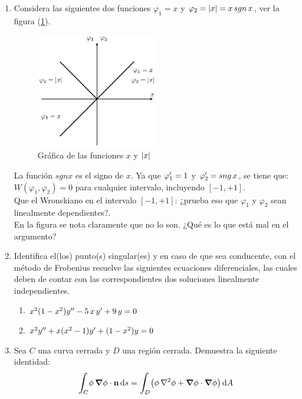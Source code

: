 \begin{enumerate}[resume]
\rule{14.6cm}{0.4pt}
\item Considera las siguientes dos funciones $\varphi_{1} = x$ y $\varphi_{2} = \abs{x} = x \, sgn \, x$, ver la figura (\ref{fig:figura_09_03}).
\\[0.5em]
\begin{minipage}[H]{\linewidth}
\begin{figure}
\vspace{-25pt}
\begin{center}
    \includegraphics[width=0.5\textwidth]{Imagenes/Ejercicio_Opcional_07.eps}
\end{center}
\caption{Gráfica de las funciones $x$ y $\abs{x}$}
\label{fig:figura_09_03}
\end{figure}

La función $sgn x$ es el signo de $x$. Ya que ${\varphi}^{\prime}_{1} = 1$ y ${\varphi}^{\prime}_{2} = sng \, x$, se tiene que: $W(\varphi_{1}, \varphi_{2}) = 0$ para cualquier intervalo, incluyendo $[-1, +1]$.
\\[0.5em]
Que el Wronskiano en el intervalo $[-1, +1]$: ¿prueba eso que $\varphi_{1}$ y $\varphi_{2}$ sean linealmente dependientes?. 
\\[0.5em]
En la figura se nota claramente que no lo son. ¿Qué es lo que está mal en el argumento?
\end{minipage}
\item Identifica el(los) punto(s) singular(es) y en caso de que sea conducente, con el método de Frobenius resuelve las siguientes ecuaciones diferenciales, las cuales deben de contar con las correspondientes dos soluciones linealmente independientes.
\begin{enumerate}[label=\alph*)]
\item $x^{2} (1 - x^{2}) {y}^{\prime \prime} - 5 \, x \, {y}^{\prime} + 9 \, y = 0$
\item $x^{2} {y}^{\prime \prime} + x (x^{2} - 1) {y}^{\prime} + (1 - x^{2}) y = 0$
\end{enumerate}
\item Sea $C$ una curva cerrada y $D$ una región cerrada. Demuestra la siguiente identidad:
\begin{align*}
\scaleint{6ex}_{\bs C} \phi \, \grad{\phi} \cdot \vb{n} \dd{s} = \scaleint{6ex}_{\bs D} \big( \phi \, \laplacian{\phi} + \grad{\phi} \cdot \grad{\phi} \big) \dd{A}
\end{align*}
\end{enumerate}

